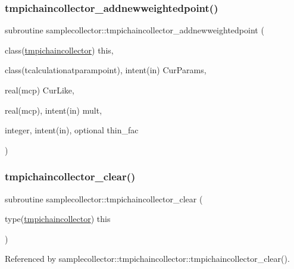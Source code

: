 \subsubsection{\texorpdfstring{tmpichaincollector\+\_\+addnewweightedpoint()}{tmpichaincollector\_addnewweightedpoint()}}
{\footnotesize\ttfamily subroutine samplecollector\+::tmpichaincollector\+\_\+addnewweightedpoint (\begin{DoxyParamCaption}\item[{class(\mbox{\hyperlink{structsamplecollector_1_1tmpichaincollector}{tmpichaincollector}})}]{this,  }\item[{class(tcalculationatparampoint), intent(in)}]{Cur\+Params,  }\item[{real(mcp)}]{Cur\+Like,  }\item[{real(mcp), intent(in)}]{mult,  }\item[{integer, intent(in), optional}]{thin\+\_\+fac }\end{DoxyParamCaption})\hspace{0.3cm}{\ttfamily [private]}}

\mbox{\label{namespacesamplecollector_ad209f28cb743e15c21d107934917f478}} 
\subsubsection{\texorpdfstring{tmpichaincollector\+\_\+clear()}{tmpichaincollector\_clear()}}
{\footnotesize\ttfamily subroutine samplecollector\+::tmpichaincollector\+\_\+clear (\begin{DoxyParamCaption}\item[{type(\mbox{\hyperlink{structsamplecollector_1_1tmpichaincollector}{tmpichaincollector}})}]{this }\end{DoxyParamCaption})\hspace{0.3cm}{\ttfamily [private]}}



Referenced by samplecollector\+::tmpichaincollector\+::tmpichaincollector\+\_\+clear().

